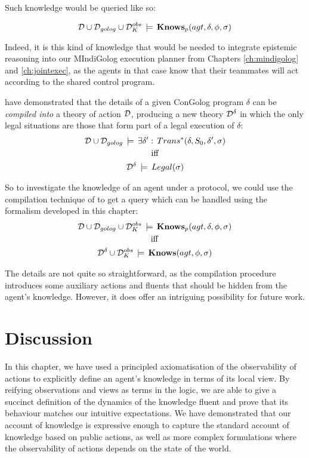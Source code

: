 Such knowledge would be queried like so:

\[
\mathcal{D}\cup\mathcal{D}_{golog}\cup\mathcal{D}_{K}^{obs}\,\models\,\mathbf{Knows}_{p}(agt,\delta,\phi,\sigma)\]


Indeed, it is this kind of knowledge that would be needed to integrate
epistemic reasoning into our MIndiGolog execution planner from Chapters
\ref{ch:mindigolog} and \ref{ch:jointexec}, as the agents in that
case know that their teammates will act according to the shared control
program.

\citet{fritz08congolog_sin_trans} have demonstrated that the details
of a given ConGolog program $\delta$ can be \emph{compiled into}
a theory of action $\mathcal{D}$, producing a new theory $\mathcal{D}^{\delta}$
in which the only legal situations are those that form part of a legal
execution of $\delta$:\begin{gather*}
\mathcal{D}\cup\mathcal{D}_{golog}\,\models\,\exists\delta':\, Trans^{*}(\delta,S_{0},\delta',\sigma)\\
\mathrm{iff}\\
\mathcal{D}^{\delta}\,\models\, Legal(\sigma)\end{gather*}


So to investigate the knowledge of an agent under a protocol, we could
use the compilation technique of \citep{fritz08congolog_sin_trans}
to get a query which can be handled using the formalism developed
in this chapter:\begin{gather*}
\mathcal{D}\cup\mathcal{D}_{golog}\cup\mathcal{D}_{K}^{obs}\,\models\,\mathbf{Knows}_{p}(agt,\delta,\phi,\sigma)\\
\mathrm{iff}\\
\mathcal{D}^{\delta}\cup\mathcal{D}_{K}^{obs}\,\models\,\mathbf{Knows}(agt,\phi,\sigma)\end{gather*}


The details are not quite so straightforward, as the compilation procedure
introduces some auxiliary actions and fluents that should be hidden
from the agent's knowledge. However, it does offer an intriguing possibility
for future work.


\section{Discussion\label{sec:Knowledge:Discussion}}

In this chapter, we have used a principled axiomatisation of the observability
of actions to explicitly define an agent's knowledge in terms of its
local view. By reifying observations and views as terms in the logic,
we are able to give a succinct definition of the dynamics of the knowledge
fluent and prove that its behaviour matches our intuitive expectations.
We have demonstrated that our account of knowledge is expressive enough
to capture the standard account of knowledge based on public actions,
as well as more complex formulations where the observability of actions
depends on the state of the world.


